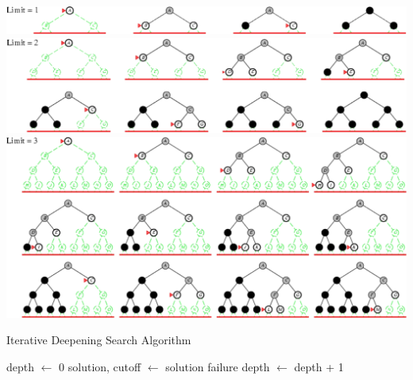 \begin{center}
    \includegraphics[width=0.67\linewidth]{figures/ids-limit-1.png}
    \includegraphics[width=0.67\linewidth]{figures/ids-limit-2.png}
    \includegraphics[width=0.67\linewidth]{figures/ids-limit-3.png}
\end{center}

\begin{algorithm}[ht!]
    \caption{Iterative Deepening Search Algorithm}

    \begin{algorithmic}
            \State depth $\gets$ 0
                \State solution, cutoff $\gets$ 
                    \State \Return solution
                    \State \Return failure
                \EndIf
                \State depth $\gets$ depth + 1
            \EndWhile
        \EndFunction
    \end{algorithmic}
\end{algorithm}

